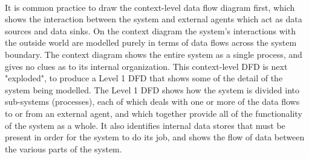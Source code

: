 \paragraph{}
It is common practice to draw the context-level data flow diagram first, which shows the interaction between the system and external agents which act as data sources and data sinks. On the context diagram the system's interactions with the outside world are modelled purely in terms of data flows across the system boundary. The context diagram shows the entire system as a single process, and gives no clues as to its internal organization.
This context-level DFD is next "exploded", to produce a Level 1 DFD that shows some of the detail of the system being modelled. The Level 1 DFD shows how the system is divided into sub-systems (processes), each of which deals with one or more of the data flows to or from an external agent, and which together provide all of the functionality of the system as a whole. It also identifies internal data stores that must be present in order for the system to do its job, and shows the flow of data between the various parts of the system.

